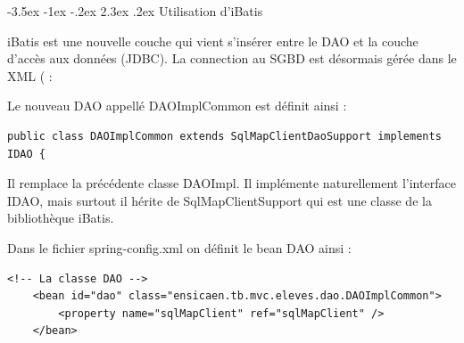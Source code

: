 \documentclass[a4paper,12pt]{article}
\makeatletter
\renewcommand\section{\@startsection {section}{1}{\z@}%
                           {-3.5ex \@plus -1ex \@minus -.2ex}%
                           {2.3ex \@plus.2ex}%
                           {\normalfont\Large\bfseries}}
\makeatother
\begin{document}
\section{Utilisation d'iBatis}

iBatis est une nouvelle couche qui vient s'insérer entre le DAO et la couche d'accès aux données (JDBC).
La connection au SGBD est désormais gérée dans le XML ( :



Le nouveau DAO appellé DAOImplCommon est définit ainsi :

\begin{lstlisting}
public class DAOImplCommon extends SqlMapClientDaoSupport implements IDAO {
\end{lstlisting}
Il remplace la précédente classe DAOImpl.
Il implémente naturellement l'interface IDAO, mais surtout il hérite de SqlMapClientSupport qui est une classe de la bibliothèque iBatis.


Dans le fichier spring-config.xml on définit le bean DAO ainsi :

\begin{lstlisting}
<!-- La classe DAO -->
	<bean id="dao" class="ensicaen.tb.mvc.eleves.dao.DAOImplCommon">
		<property name="sqlMapClient" ref="sqlMapClient" />
	</bean>
\end{lstlisting}
\end{document}
